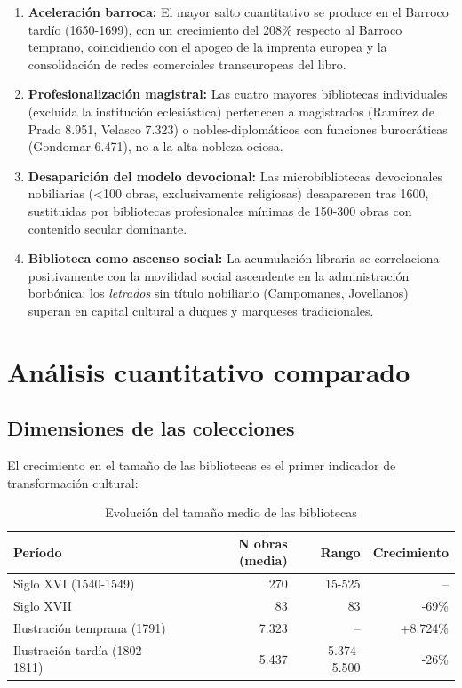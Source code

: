 \documentclass[12pt,a4paper]{article}
\begin{document}
\begin{enumerate}[label=\textbf{H\arabic*:}]
\item \textbf{Aceleración barroca:} El mayor salto cuantitativo se produce en el Barroco tardío (1650-1699), con un crecimiento del 208\% respecto al Barroco temprano, coincidiendo con el apogeo de la imprenta europea y la consolidación de redes comerciales transeuropeas del libro.

\item \textbf{Profesionalización magistral:} Las cuatro mayores bibliotecas individuales (excluida la institución eclesiástica) pertenecen a magistrados (Ramírez de Prado 8.951, Velasco 7.323) o nobles-diplomáticos con funciones burocráticas (Gondomar 6.471), no a la alta nobleza ociosa.

\item \textbf{Desaparición del modelo devocional:} Las microbibliotecas devocionales nobiliarias (<100 obras, exclusivamente religiosas) desaparecen tras 1600, sustituidas por bibliotecas profesionales mínimas de 150-300 obras con contenido secular dominante.

\item \textbf{Biblioteca como ascenso social:} La acumulación libraria se correlaciona positivamente con la movilidad social ascendente en la administración borbónica: los \textit{letrados} sin título nobiliario (Campomanes, Jovellanos) superan en capital cultural a duques y marqueses tradicionales.
\end{enumerate}

\section{Análisis cuantitativo comparado}

\subsection{Dimensiones de las colecciones}

El crecimiento en el tamaño de las bibliotecas es el primer indicador de transformación cultural:

\begin{table}[h]
\centering
\begin{tabular}{lrrr}
\toprule
\textbf{Período} & \textbf{N obras (media)} & \textbf{Rango} & \textbf{Crecimiento} \\
\midrule
Siglo XVI (1540-1549) & 270 & 15-525 & -- \\
Siglo XVII & 83 & 83 & -69\% \\
Ilustración temprana (1791) & 7.323 & -- & +8.724\% \\
Ilustración tardía (1802-1811) & 5.437 & 5.374-5.500 & -26\% \\
\bottomrule
\end{tabular}
\caption{Evolución del tamaño medio de las bibliotecas}
\end{table}
\end{document}
